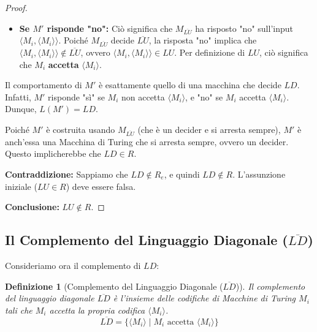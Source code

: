 \documentclass[a4paper, 11pt]{book} %
\newtheorem{definition}[theorem]{Definizione}
\theoremstyle{definition}
\begin{document}
\begin{proof}
\begin{itemize}
    Poiché $M_{\overline{LU}}$ decide $\overline{LU}$, la risposta "sì" implica che $\langle M_i, \langle M_i \rangle \rangle \in \overline{LU}$.
    Per definizione di $\overline{LU}$, ciò significa che $M_i$ \textbf{non accetta} $\langle M_i \rangle$.
    \item \textbf{Se $M'$ risponde "no":}
    Ciò significa che $M_{\overline{LU}}$ ha risposto "no" sull'input $\langle M_i, \langle M_i \rangle \rangle$.
    Poiché $M_{\overline{LU}}$ decide $\overline{LU}$, la risposta "no" implica che $\langle M_i, \langle M_i \rangle \rangle \notin \overline{LU}$, ovvero $\langle M_i, \langle M_i \rangle \rangle \in LU$.
    Per definizione di $LU$, ciò significa che $M_i$ \textbf{accetta} $\langle M_i \rangle$.
\end{itemize}
Il comportamento di $M'$ è esattamente quello di una macchina che decide $LD$. Infatti, $M'$ risponde "sì" se $M_i$ non accetta $\langle M_i \rangle$, e "no" se $M_i$ accetta $\langle M_i \rangle$. Dunque, $L(M') = LD$.

Poiché $M'$ è costruita usando $M_{\overline{LU}}$ (che è un decider e si arresta sempre), $M'$ è anch'essa una Macchina di Turing che si arresta sempre, ovvero un decider.
Questo implicherebbe che $LD \in R$.

\textbf{Contraddizione:} Sappiamo che $LD \notin R_e$, e quindi $LD \notin R$.
L'assunzione iniziale ($LU \in R$) deve essere falsa.

\textbf{Conclusione:} $LU \notin R$.
\end{proof}

\subsection{Il Complemento del Linguaggio Diagonale ($\overline{LD}$)}
Consideriamo ora il complemento di $LD$:
\begin{definition}[Complemento del Linguaggio Diagonale ($\overline{LD}$)]
Il complemento del linguaggio diagonale $\overline{LD}$ è l'insieme delle codifiche di Macchine di Turing $M_i$ tali che $M_i$ accetta la propria codifica $\langle M_i \rangle$.
\[ \overline{LD} = \{ \langle M_i \rangle \mid M_i \text{ accetta } \langle M_i \rangle \} \]
\end{definition}
\end{document}
